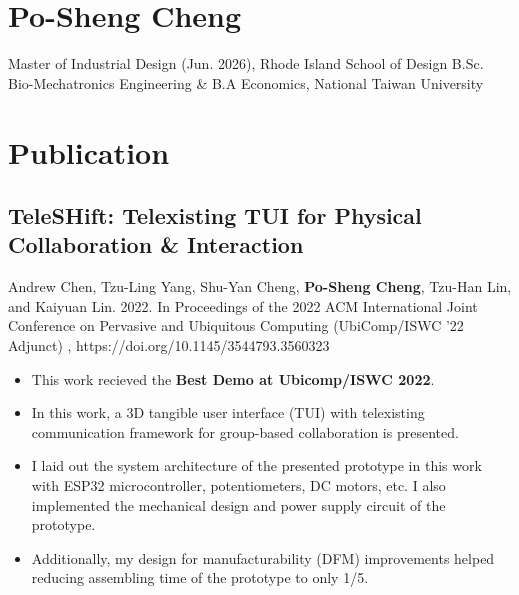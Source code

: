 \documentclass[12pt]{article}
\begin{document}
    \section*{Po-Sheng Cheng} 
    {\sffamily
    Master of Industrial Design (Jun. 2026), Rhode Island School of Design \newline
    B.Sc. Bio-Mechatronics Engineering \& B.A Economics, National Taiwan University
    }
    \section*{Publication}
        \subsection*{TeleSHift: Telexisting TUI for Physical Collaboration \& Interaction}
        {\sffamily
        {\footnotesize Andrew Chen, Tzu-Ling Yang, Shu-Yan Cheng, \textbf{Po-Sheng Cheng}, Tzu-Han Lin, and Kaiyuan Lin. 2022. In Proceedings of the 2022 ACM International Joint Conference on Pervasive and Ubiquitous Computing (UbiComp/ISWC '22 Adjunct)%
        , https://doi.org/10.1145/3544793.3560323}
        \begin{itemize}
            \item This work recieved the \textbf{Best Demo at Ubicomp/ISWC 2022}.
            \item In this work, a 3D tangible user interface (TUI) with telexisting communication framework for group-based collaboration is presented.
            \item I laid out the system architecture of the presented prototype in this work with ESP32 microcontroller, potentiometers, DC motors, etc. I also implemented the mechanical design and power supply circuit of the prototype.
            \item Additionally, my design for manufacturability (DFM) improvements helped reducing assembling time of the prototype to only 1/5.
        \end{itemize}
        }
\end{document}

